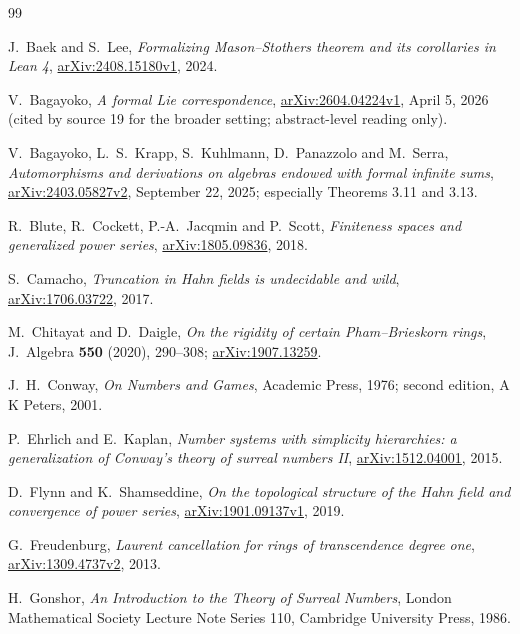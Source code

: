 \documentclass[11pt,oneside]{article}
\numberwithin{equation}{section}
\theoremstyle{definition}
\theoremstyle{remark}
\begin{document}
\begin{thebibliography}{99}
\small

J.~Baek and S.~Lee, \emph{Formalizing Mason--Stothers theorem and its corollaries in Lean 4},
\href{https://arxiv.org/abs/2408.15180}{arXiv:2408.15180v1}, 2024.

V.~Bagayoko, \emph{A formal Lie correspondence},
\href{https://arxiv.org/abs/2604.04224}{arXiv:2604.04224v1}, April 5, 2026 (cited by source 19 for the broader setting;
abstract-level reading only).

V.~Bagayoko, L.~S.~Krapp, S.~Kuhlmann, D.~Panazzolo and M.~Serra,
\emph{Automorphisms and derivations on algebras endowed with formal infinite sums},
\href{https://arxiv.org/abs/2403.05827v2}{arXiv:2403.05827v2}, September 22, 2025;
especially Theorems 3.11 and 3.13.

R.~Blute, R.~Cockett, P.-A.~Jacqmin and P.~Scott, \emph{Finiteness spaces and generalized
power series}, \href{https://arxiv.org/abs/1805.09836}{arXiv:1805.09836}, 2018.

S.~Camacho, \emph{Truncation in Hahn fields is undecidable and wild},
\href{https://arxiv.org/abs/1706.03722}{arXiv:1706.03722}, 2017.

M.~Chitayat and D.~Daigle, \emph{On the rigidity of certain Pham--Brieskorn rings},
J.~Algebra \textbf{550} (2020), 290--308;
\href{https://arxiv.org/abs/1907.13259}{arXiv:1907.13259}.

J.~H.~Conway, \emph{On Numbers and Games}, Academic Press, 1976; second edition,
A K Peters, 2001.

P.~Ehrlich and E.~Kaplan, \emph{Number systems with simplicity hierarchies: a
generalization of Conway's theory of surreal numbers II},
\href{https://arxiv.org/abs/1512.04001}{arXiv:1512.04001}, 2015.

D.~Flynn and K.~Shamseddine, \emph{On the topological structure of the Hahn field and convergence of
power series}, \href{https://arxiv.org/abs/1901.09137}{arXiv:1901.09137v1}, 2019.

G.~Freudenburg, \emph{Laurent cancellation for rings of transcendence degree one},
\href{https://arxiv.org/abs/1309.4737}{arXiv:1309.4737v2}, 2013.

H.~Gonshor, \emph{An Introduction to the Theory of Surreal Numbers}, London
Mathematical Society Lecture Note Series 110, Cambridge University Press, 1986.


\end{thebibliography}
\end{document}
